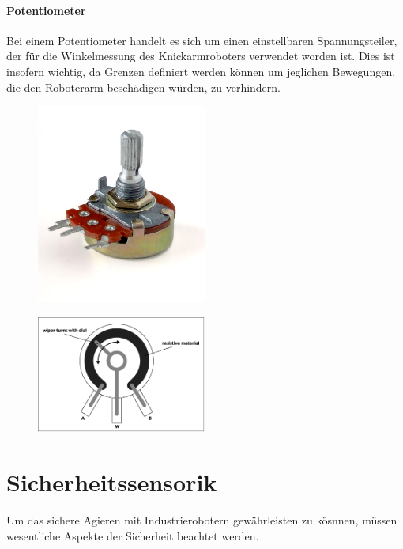 \documentclass[11pt, a4paper]{article}
\begin{document}
\paragraph{Potentiometer}
Bei einem Potentiometer handelt es sich um einen einstellbaren Spannungsteiler, der f\"ur die
Winkelmessung des Knickarmroboters verwendet worden ist. Dies ist insofern wichtig, da Grenzen
definiert werden k\"onnen um jeglichen Bewegungen, die den Roboterarm besch\"adigen w\"urden, zu
verhindern. \\
\begin{figure}[h!]
		\centering
		\includegraphics[width=0.5\textwidth]{graphics/sensors/potentiometer}
\end{figure} 
\begin{figure}[h!]
		\centering
		\includegraphics[width=0.5\textwidth]{graphics/sensors/potentiometer-inside}
\end{figure} 

\newpage
\section{Sicherheitssensorik}
Um das sichere Agieren mit Industrierobotern gew\"ahrleisten zu k\"osnnen, m\"ussen wesentliche Aspekte der Sicherheit beachtet werden.\cite{robot-sensors}
\end{document}
